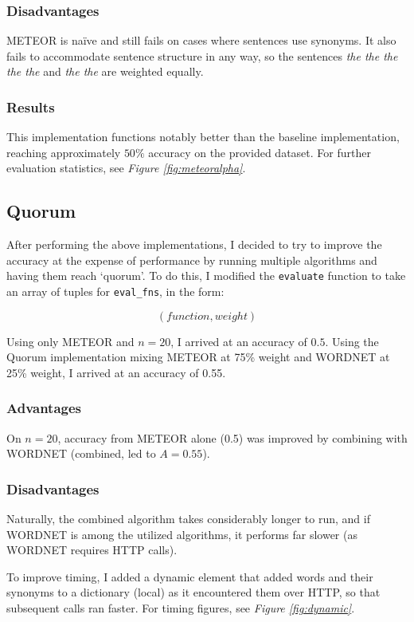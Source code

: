 \documentclass{article}
\begin{document}
\subsubsection{Disadvantages}
METEOR is naïve and still fails on cases where sentences use synonyms. It also fails to accommodate sentence structure in any way, so the sentences \textit{the the the the the} and \textit{the the} are weighted equally.

\subsubsection{Results}
This implementation functions notably better than the baseline implementation, reaching approximately $50\%$ accuracy on the provided dataset. For further evaluation statistics, see \textit{Figure \ref{fig:meteoralpha}}.

\subsection{Quorum}
After performing the above implementations, I decided to try to improve the accuracy at the expense of performance by running multiple algorithms and having them reach `quorum'. To do this, I modified the \texttt{evaluate} function to take an array of tuples for \texttt{eval\_fns}, in the form:

$$(function, weight)$$

Using only METEOR and $n=20$, I arrived at an accuracy of $0.5$. Using the Quorum implementation mixing METEOR at 75\% weight and WORDNET at 25\% weight, I arrived at an accuracy of 0.55.

\subsubsection{Advantages}
On $n=20$, accuracy from METEOR alone (0.5) was improved by combining with WORDNET (combined, led to $A=0.55$).

\subsubsection{Disadvantages}
Naturally, the combined algorithm takes considerably longer to run, and if WORDNET is among the utilized algorithms, it performs far slower (as WORDNET requires HTTP calls).

To improve timing, I added a dynamic element that added words and their synonyms to a dictionary (local) as it encountered them over HTTP, so that subsequent calls ran faster. For timing figures, see \textit{Figure \ref{fig:dynamic}}.
\end{document}
